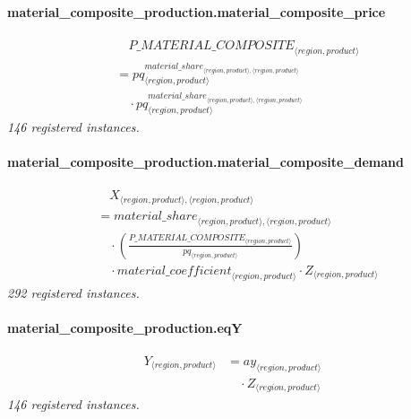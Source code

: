 \documentclass[11pt]{article}
\begin{document}
\paragraph{material\_composite\_production.material\_composite\_price}
\begin{align*}
&\quad {P\_MATERIAL\_COMPOSITE}_{\langle region, product\rangle}\\
&= pq_{\langle region, product\rangle}^{{material\_share}_{\langle region, product\rangle,\langle region, product\rangle}}\\
&\quad {}\cdot pq_{\langle region, product\rangle}^{{material\_share}_{\langle region, product\rangle,\langle region, product\rangle}}
\end{align*}
\noindent\emph{146 registered instances.}\par
\paragraph{material\_composite\_production.material\_composite\_demand}
\begin{align*}
&\quad X_{\langle region, product\rangle,\langle region, product\rangle}\\
&= {material\_share}_{\langle region, product\rangle,\langle region, product\rangle}\\
&\quad {}\cdot (\frac{{P\_MATERIAL\_COMPOSITE}_{\langle region, product\rangle}}{pq_{\langle region, product\rangle}})\\
&\quad {}\cdot {material\_coefficient}_{\langle region, product\rangle} \cdot Z_{\langle region, product\rangle}
\end{align*}
\noindent\emph{292 registered instances.}\par
\paragraph{material\_composite\_production.eqY}
\begin{align*}
Y_{\langle region, product\rangle} &= ay_{\langle region, product\rangle}\\
&\quad {}\cdot Z_{\langle region, product\rangle}
\end{align*}
\noindent\emph{146 registered instances.}\par
\end{document}
